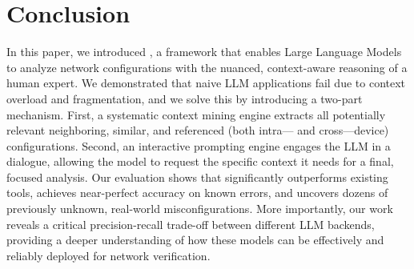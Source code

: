 \section{Conclusion}
\label{sec:conclusion}


In this paper, we introduced \sysname{}, a framework that enables Large Language Models to analyze network configurations with the nuanced, context-aware reasoning of a human expert. We demonstrated that naive LLM applications fail due to context overload and fragmentation, and we solve this by introducing a two-part mechanism. First, a systematic context mining engine extracts all potentially relevant neighboring, similar, and referenced (both intra--- and cross---device) configurations. Second, an interactive prompting engine engages the LLM in a dialogue, allowing the model to request the specific context it needs for a final, focused analysis. Our evaluation shows that \sysname{} significantly outperforms existing tools, achieves near-perfect accuracy on known errors, and uncovers dozens of previously unknown, real-world misconfigurations. More importantly, our work reveals a critical precision-recall trade-off between different LLM backends, providing a deeper understanding of how these models can be effectively and reliably deployed for network verification.

